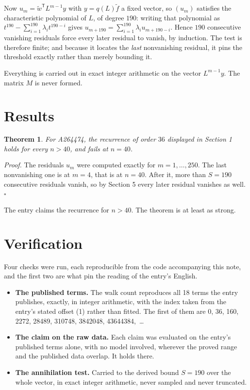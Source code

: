 \documentclass[11pt]{article}
\newtheorem{theorem}{Theorem}
\theoremstyle{definition}
\begin{document}
Now $u_m = \tilde w^{\mathsf T} L^{m-1} y$ with $y = q(L)\tilde f$ a fixed vector, so $(u_m)$ satisfies the characteristic polynomial of $L$, of degree $190$: writing that polynomial as $t^{190} - \sum_{i=1}^{190} \lambda_i t^{190-i}$ gives $u_{m+190} = \sum_{i=1}^{190} \lambda_i u_{m+190-i}$. Hence $190$ consecutive vanishing residuals force every later residual to vanish, by induction. The test is therefore finite; and because it locates the {\itshape last} nonvanishing residual, it pins the threshold exactly rather than merely bounding it.

Everything is carried out in exact integer arithmetic on the vector $L^{m-1}y$. The matrix $M$ is never formed.

\section{Results}

\begin{theorem} For A264474, the recurrence of order $36$ displayed in Section 1 holds for every $n > 40$, and fails at $n = 40$.\end{theorem}

{\itshape Proof.} The residuals $u_m$ were computed exactly for $m = 1,\dots,250$. The last nonvanishing one is at $m = 4$, that is at $n = 40$. After it, more than $S = 190$ consecutive residuals vanish, so by Section 5 every later residual vanishes as well. $\square$

The entry claims the recurrence for $n > 40$. The theorem is at least as strong.

\section{Verification}

Four checks were run, each reproducible from the code accompanying this note, and the first two are what pin the reading of the entry's English.

\begin{itemize}

\item {\bfseries The published terms.} The walk count reproduces all 18 terms the entry publishes, exactly, in integer arithmetic, with the index taken from the entry's stated offset (1) rather than fitted. The first of them are 0, 36, 160, 2272, 28489, 310748, 3842048, 43644384,~\dots

\item {\bfseries The claim on the raw data.} Each claim was evaluated on the entry's published terms alone, with no model involved, wherever the proved range and the published data overlap. It holds there.

\item {\bfseries The annihilation test.} Carried to the derived bound $S = 190$ over the whole vector, in exact integer arithmetic, never sampled and never truncated.

\end{itemize}
\end{document}
